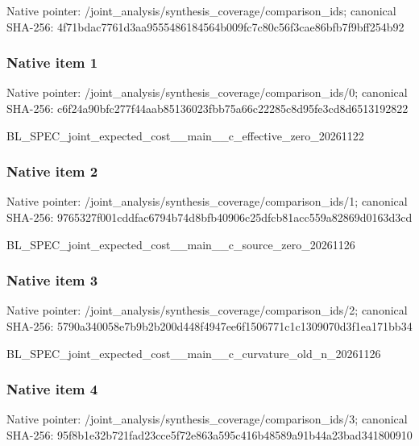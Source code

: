 \documentclass[10pt,a4paper]{article}
\begin{document}
Native pointer: /joint\_analysis/synthesi\allowbreak{}s\_coverage/comparison\_id\allowbreak{}s; canonical SHA-256: 4f71bdac7761d3aa95554861\allowbreak{}84564b009fc7c80c56f3cae8\allowbreak{}6bfb7f9bff254b92



\subsubsection{Native item 1}


Native pointer: /joint\_analysis/synthesi\allowbreak{}s\_coverage/comparison\_id\allowbreak{}s/0; canonical SHA-256: c6f24a90bfc277f44aab8513\allowbreak{}6023fbb75a66c22285c8d95f\allowbreak{}e3cd8d6513192822


BL\_SPEC\_joint\_expected\_c\allowbreak{}ost\_\_main\_\_c\_effective\_z\allowbreak{}ero\_20261122


\subsubsection{Native item 2}


Native pointer: /joint\_analysis/synthesi\allowbreak{}s\_coverage/comparison\_id\allowbreak{}s/1; canonical SHA-256: 9765327f001cddfac6794b74\allowbreak{}d8bfb40906c25dfcb81acc55\allowbreak{}9a82869d0163d3cd


BL\_SPEC\_joint\_expected\_c\allowbreak{}ost\_\_main\_\_c\_source\_zero\allowbreak{}\_20261126


\subsubsection{Native item 3}


Native pointer: /joint\_analysis/synthesi\allowbreak{}s\_coverage/comparison\_id\allowbreak{}s/2; canonical SHA-256: 5790a340058e7b9b2b200d44\allowbreak{}8f4947ee6f1506771c1c1309\allowbreak{}070d3f1ea171bb34


BL\_SPEC\_joint\_expected\_c\allowbreak{}ost\_\_main\_\_c\_curvature\_o\allowbreak{}ld\_n\_20261126


\subsubsection{Native item 4}


Native pointer: /joint\_analysis/synthesi\allowbreak{}s\_coverage/comparison\_id\allowbreak{}s/3; canonical SHA-256: 95f8b1e32b721fad23cce5f7\allowbreak{}2e863a595c416b48589a91b4\allowbreak{}4a23bad341800910
\end{document}
